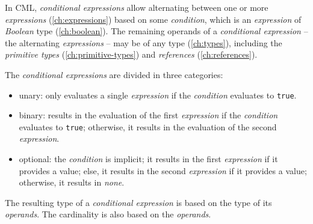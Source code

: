 In CML, \emph{conditional expressions} allow alternating between
one or more \emph{expressions} (\ref{ch:expressions})
based on some \emph{condition},
which is an \emph{expression} of \emph{Boolean} type (\ref{ch:boolean}).
The remaining operands of a \emph{conditional expression}
-- the alternating \emph{expressions} --
may be of any type (\ref{ch:types}),
including the \emph{primitive types} (\ref{ch:primitive-types})
and \emph{references} (\ref{ch:references}).

The \emph{conditional expressions} are divided in three categories:

\begin{itemize}
\item unary: only evaluates a single \emph{expression}
if the \emph{condition} evaluates to \verb!true!.
\item binary: results in the evaluation of the first \emph{expression}
if the \emph{condition} evaluates to \verb!true!;
otherwise, it results in the evaluation of the second \emph{expression}.
\item optional: the \emph{condition} is implicit;
it results in the first \emph{expression} if it provides a value;
else, it results in the second \emph{expression} if it provides a value;
otherwise, it results in \emph{none}.
\end{itemize}

The resulting type of a \emph{conditional expression}
is based on the type of its \emph{operands}.
The cardinality is also based on the \emph{operands}.
